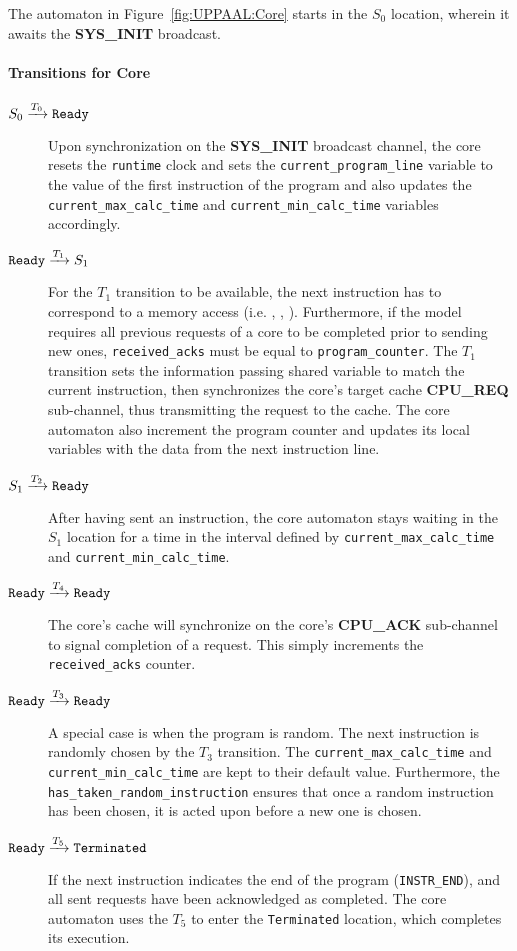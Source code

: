 The automaton in Figure~\ref{fig:UPPAAL:Core} starts in the $S_0$
location, wherein it awaits the \textbf{SYS\_INIT} broadcast.

\paragraph{Transitions for Core}
\begin{description}
\item[$S_0 \xrightarrow[]{T_0} \texttt{Ready}$]
   Upon synchronization on the \textbf{SYS\_INIT} broadcast channel,
   the core resets the \lstinline!runtime! clock and sets the
   \lstinline!current_program_line! variable to the value of the first
   instruction of the program and also updates the
   \lstinline!current_max_calc_time! and \lstinline!current_min_calc_time!
   variables accordingly.
\item[$\texttt{Ready} \xrightarrow[]{T_1} S_1$]
   For the $T_1$ transition to be available, the next instruction has to
   correspond to a memory access (i.e. \loadinstr{},
   \storeinstr{}, \evictinstr{}). Furthermore, if the model requires all
   previous requests of a core to be completed prior to sending new ones,
   \lstinline!received_acks! must be equal to \lstinline!program_counter!.
   The $T_1$ transition sets the information passing shared variable to match
   the current instruction, then synchronizes the core's target cache
   \textbf{CPU\_REQ} sub-channel, thus transmitting the request to the cache.
   The core automaton also increment the program counter and updates its local
   variables with the data from the next instruction line.
\item[$S_1 \xrightarrow[]{T_2} \texttt{Ready}$]
   After having sent an instruction, the core automaton stays waiting in the
   $S_1$ location for a time in the interval defined by
   \lstinline!current_max_calc_time! and \lstinline!current_min_calc_time!.
\item[$\texttt{Ready} \xrightarrow[]{T_4} \texttt{Ready}$]
   The core's cache will synchronize on the core's \textbf{CPU\_ACK} sub-channel
   to signal completion of a request. This simply increments the
   \lstinline!received_acks! counter.
\item[$\texttt{Ready} \xrightarrow[]{T_3} \texttt{Ready}$]
   A special case is when the program is random. The next instruction is
   randomly chosen by the $T_3$ transition. The
   \lstinline!current_max_calc_time! and \lstinline!current_min_calc_time! are
   kept to their default value. Furthermore, the
   \lstinline!has_taken_random_instruction! ensures that once a random
   instruction has been chosen, it is acted upon before a new one is chosen.
\item[$\texttt{Ready} \xrightarrow[]{T_5} \texttt{Terminated}$]
   If the next instruction indicates the end of the program
   (\lstinline!INSTR_END!), and all sent requests have been acknowledged as
   completed. The core automaton uses the $T_5$ to enter the \texttt{Terminated}
   location, which completes its execution.
\end{description}
